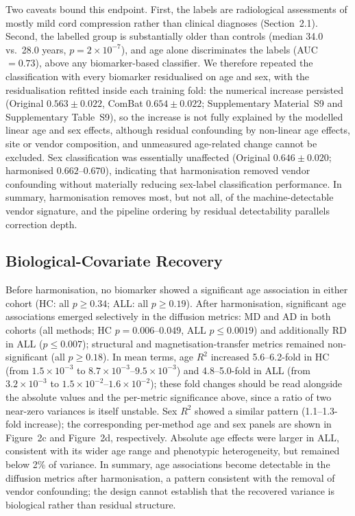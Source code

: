 \documentclass[12pt,a4paper]{article}
\begin{document}
Two caveats bound this endpoint. First, the labels are radiological assessments of mostly mild cord compression rather than clinical diagnoses (Section~2.1). Second, the labelled group is substantially older than controls (median 34.0 vs.\ 28.0 years, $p=2\times10^{-7}$), and age alone discriminates the labels (AUC $=0.73$), above any biomarker-based classifier. We therefore repeated the classification with every biomarker residualised on age and sex, with the residualisation refitted inside each training fold: the numerical increase persisted (Original $0.563\pm0.022$, ComBat $0.654\pm0.022$; Supplementary Material~S9 and Supplementary Table~S9), so the increase is not fully explained by the modelled linear age and sex effects, although residual confounding by non-linear age effects, site or vendor composition, and unmeasured age-related change cannot be excluded. Sex classification was essentially unaffected (Original $0.646\pm0.020$; harmonised $0.662$--$0.670$), indicating that harmonisation removed vendor confounding without materially reducing sex-label classification performance. In summary, harmonisation removes most, but not all, of the machine-detectable vendor signature, and the pipeline ordering by residual detectability parallels correction depth.

\subsection{Biological-Covariate Recovery}

Before harmonisation, no biomarker showed a significant age association in either cohort (HC: all $p\geq0.34$; ALL: all $p\geq0.19$). After harmonisation, significant age associations emerged selectively in the diffusion metrics: MD and AD in both cohorts (all methods; HC $p=0.006$--$0.049$, ALL $p\leq0.0019$) and additionally RD in ALL ($p\leq0.007$); structural and magnetisation-transfer metrics remained non-significant (all $p\geq0.18$). In mean terms, age $R^2$ increased 5.6--6.2-fold in HC (from $1.5\times10^{-3}$ to $8.7\times10^{-3}$--$9.5\times10^{-3}$) and 4.8--5.0-fold in ALL (from $3.2\times10^{-3}$ to $1.5\times10^{-2}$--$1.6\times10^{-2}$); these fold changes should be read alongside the absolute values and the per-metric significance above, since a ratio of two near-zero variances is itself unstable. Sex $R^2$ showed a similar pattern (1.1--1.3-fold increase); the corresponding per-method age and sex panels are shown in Figure~2c and Figure~2d, respectively. Absolute age effects were larger in ALL, consistent with its wider age range and phenotypic heterogeneity, but remained below 2\% of variance. In summary, age associations become detectable in the diffusion metrics after harmonisation, a pattern consistent with the removal of vendor confounding; the design cannot establish that the recovered variance is biological rather than residual structure.
\end{document}
